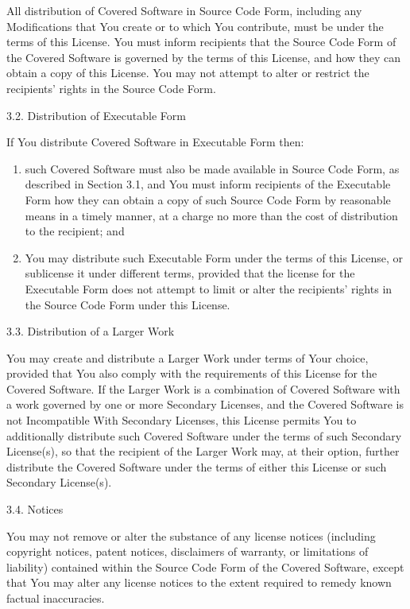 \documentclass[letterpaper,10pt,english]{sphinxmanual}
\begin{document}
All distribution of Covered Software in Source Code Form, including any
Modifications that You create or to which You contribute, must be under
the terms of this License. You must inform recipients that the Source
Code Form of the Covered Software is governed by the terms of this
License, and how they can obtain a copy of this License. You may not
attempt to alter or restrict the recipients’ rights in the Source Code
Form.

3.2. Distribution of Executable Form

If You distribute Covered Software in Executable Form then:
\begin{enumerate}
\def\theenumi{\alph{enumi}}
\def\labelenumi{(\theenumi )}
\makeatletter\def\p@enumii{\p@enumi (\theenumi )}\makeatother
\item {} 
such Covered Software must also be made available in Source Code
Form, as described in Section 3.1, and You must inform recipients of
the Executable Form how they can obtain a copy of such Source Code
Form by reasonable means in a timely manner, at a charge no more
than the cost of distribution to the recipient; and

\item {} 
You may distribute such Executable Form under the terms of this
License, or sublicense it under different terms, provided that the
license for the Executable Form does not attempt to limit or alter
the recipients’ rights in the Source Code Form under this License.

\end{enumerate}

3.3. Distribution of a Larger Work

You may create and distribute a Larger Work under terms of Your choice,
provided that You also comply with the requirements of this License for
the Covered Software. If the Larger Work is a combination of Covered
Software with a work governed by one or more Secondary Licenses, and the
Covered Software is not Incompatible With Secondary Licenses, this
License permits You to additionally distribute such Covered Software
under the terms of such Secondary License(s), so that the recipient of
the Larger Work may, at their option, further distribute the Covered
Software under the terms of either this License or such Secondary
License(s).

3.4. Notices

You may not remove or alter the substance of any license notices
(including copyright notices, patent notices, disclaimers of warranty,
or limitations of liability) contained within the Source Code Form of
the Covered Software, except that You may alter any license notices to
the extent required to remedy known factual inaccuracies.
\end{document}
